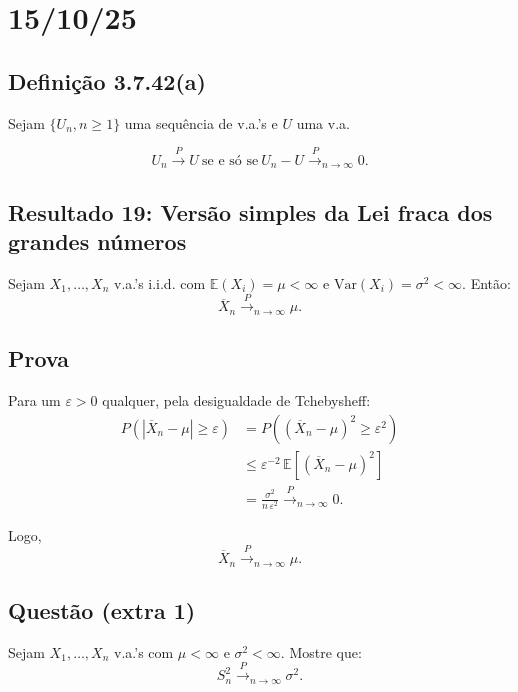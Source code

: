 \section*{15/10/25}

\subsection*{Definição 3.7.42(a)}
Sejam $\{U_n, n \geq 1\}$ uma sequência de v.a.'s e $U$ uma v.a.

\[
U_n \xrightarrow{P} U \ \text{se e só se} \ U_n - U \xrightarrow{P}_{n \to \infty} 0.
\]

\subsection*{Resultado 19: Versão simples da Lei fraca dos grandes números}
Sejam $X_1, \ldots, X_n$ v.a.'s i.i.d. com $\mathbb{E}(X_i) = \mu < \infty$ e $\mathrm{Var}(X_i) = \sigma^2 < \infty$. Então:
\[
\overline{X}_n \xrightarrow{P}_{n \to \infty} \mu.
\]

\subsection*{Prova}
Para um $\varepsilon > 0$ qualquer, pela desigualdade de Tchebysheff:
\begin{equation}
\begin{aligned}
P\left( \left| \overline{X}_n - \mu \right| \geq \varepsilon \right) &= P\left( \left( \overline{X}_n - \mu \right)^2 \geq \varepsilon^2 \right) \\
&\leq \varepsilon^{-2} \, \mathbb{E} \left[ \left( \overline{X}_n - \mu \right)^2 \right] \\
&= \frac{\sigma^2}{n \, \varepsilon^2} \xrightarrow{P}_{n \to \infty} 0.
\end{aligned}
\end{equation}

Logo,
\[
\overline{X}_n \xrightarrow{P}_{n \to \infty} \mu.
\]

\subsection*{Questão (extra 1)}
Sejam $X_1, \ldots, X_n$ v.a.'s com $\mu < \infty$ e $\sigma^2 < \infty$. Mostre que:
\[
S_n^2 \xrightarrow{P}_{n \to \infty} \sigma^2.
\]
